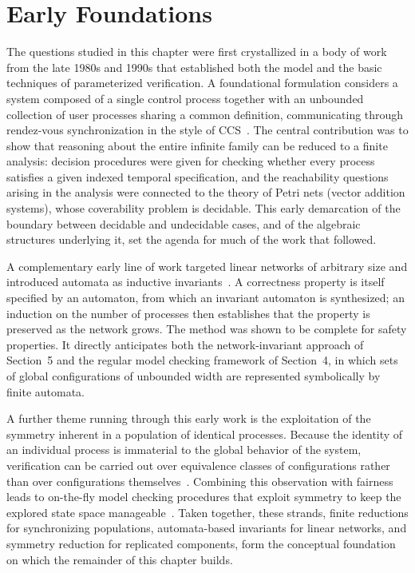 \section{Early Foundations}

The questions studied in this chapter were first crystallized in a body of work
from the late 1980s and 1990s that established both the model and the basic
techniques of parameterized verification. A foundational formulation considers a
system composed of a single control process together with an unbounded
collection of user processes sharing a common definition, communicating through
rendez-vous synchronization in the style of CCS~\cite{GerSis92}. The central
contribution was to show that reasoning about the entire infinite family can be
reduced to a finite analysis: decision procedures were given for checking
whether every process satisfies a given indexed temporal specification, and the
reachability questions arising in the analysis were connected to the theory of
Petri nets (vector addition systems), whose coverability problem is decidable.
This early demarcation of the boundary between decidable and undecidable cases,
and of the algebraic structures underlying it, set the agenda for much of the
work that followed.

A complementary early line of work targeted linear networks of arbitrary size
and introduced automata as inductive invariants~\cite{SisGyu99}. A correctness
property is itself specified by an automaton, from which an invariant automaton
is synthesized; an induction on the number of processes then establishes that
the property is preserved as the network grows. The method was shown to be
complete for safety properties. It directly anticipates both the
network-invariant approach of Section~5 and the regular model checking
framework of Section~4, in which sets of global configurations of unbounded
width are represented symbolically by finite automata.

A further theme running through this early work is the exploitation of the
symmetry inherent in a population of identical processes. Because the identity
of an individual process is immaterial to the global behavior of the system,
verification can be carried out over equivalence classes of configurations
rather than over configurations themselves~\cite{EmeSis96}. Combining this
observation with fairness leads to on-the-fly model checking procedures that
exploit symmetry to keep the explored state space manageable~\cite{GyuSis97}.
Taken together, these strands, finite reductions for synchronizing populations,
automata-based invariants for linear networks, and symmetry reduction for
replicated components, form the conceptual foundation on which the remainder
of this chapter builds.
